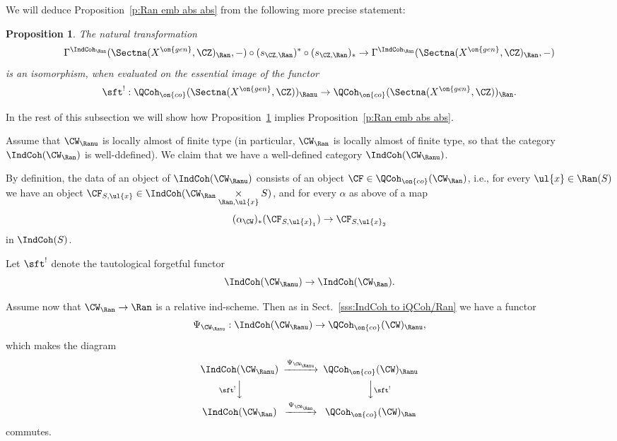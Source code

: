 \documentclass[9pt]{amsart}
\newtheorem{prop}[subsubsection]{Proposition}
\theoremstyle{remark}
\theoremstyle{definition}
\theoremstyle{remark}
\newcommand{\secref}[1]{Sect.~\ref{#1}}
\newcommand{\propref}[1]{Proposition~\ref{#1}}
\numberwithin{equation}{section}
\begin{document}
\medskip

We will deduce \propref{p:Ran emb abs abs} from the following more precise statement:

\begin{prop} \label{p:Ran emb unital}
The natural transformation
$$\Gamma^{\IndCoh_\Ran}(\Sectna(X^{\on{gen}},\CZ)_\Ran,-)\circ (s_{\CZ,\Ran})^*\circ (s_{\CZ,\Ran})_*\to \Gamma^{\IndCoh_\Ran}(\Sectna(X^{\on{gen}},\CZ)_\Ran,-)$$
is an isomorphism, when evaluated on the essential image of the functor 
$$\sft^!:\QCoh_{\on{co}}(\Sectna(X^{\on{gen}},\CZ))_\Ranu\to \QCoh_{\on{co}}(\Sectna(X^{\on{gen}},\CZ))_\Ran.$$
\end{prop}

\medskip

In the rest of this subsection we will show how \propref{p:Ran emb unital} implies \propref{p:Ran emb abs abs}.

\sssec{}

Assume that $\CW_\Ranu$ is locally almost of finite type (in particular, $\CW_\Ran$ is locally almost of finite type, so that
the category $\IndCoh(\CW_\Ran)$ is well-ddefined). We claim that we have a well-defined category $\IndCoh(\CW_\Ranu)$.

\medskip

By definition, the data of an object of $\IndCoh(\CW_\Ranu)$ consists of an object $\CF\in \QCoh_{\on{co}}(\CW_\Ran)$, i.e., for every
$\ul{x}\in \Ran(S)$ we have an object $\CF_{S,\ul{x}}\in \IndCoh(\CW_\Ran\underset{\Ran,\ul{x}}\times S)$, and 
for every $\alpha$ as above of a map
$$(\alpha_\CW)_*(\CF_{S,\ul{x}_1})  \to \CF_{S,\ul{x}_2}$$
in $\IndCoh(S)$. 

\medskip

Let $\sft^!$ denote the tautological forgetful functor
$$\IndCoh(\CW_\Ranu)\to \IndCoh(\CW_\Ran).$$

\sssec{}

Assume now that $\CW_\Ran\to \Ran$ is a relative ind-scheme. Then as in \secref{sss:IndCoh to iQCoh/Ran} we have a functor
\begin{equation} \label{e:IndCoh to iQCoh/Ranu}
\Psi_{\CW_\Ranu}:\IndCoh(\CW_\Ranu)\to \QCoh_{\on{co}}(\CW)_\Ranu,
\end{equation}
which makes the diagram
$$
\CD
\IndCoh(\CW_\Ranu) @>{\Psi_{\CW_\Ranu}}>> \QCoh_{\on{co}}(\CW)_\Ranu \\
@V{\sft^!}VV @VV{\sft^!}V \\
\IndCoh(\CW_\Ran) @>{\Psi_{\CW_\Ran}}>> \QCoh_{\on{co}}(\CW)_\Ran
\endCD
$$
commutes. 
\end{document}
